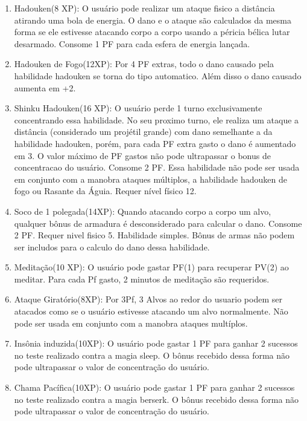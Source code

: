 \begin{enumerate}
  	\item Hadouken(8 XP): O usuário pode realizar um ataque fisico a distância atirando uma bola de energia. O dano e o ataque são calculados da mesma forma se ele estivesse atacando corpo a corpo usando a péricia bélica lutar desarmado. Consome 1 PF para cada esfera de energia lançada. 
  
\item Hadouken de Fogo(12XP): Por 4 PF extras, todo o dano causado pela habilidade hadouken se torna do tipo automatico. Além disso o dano causado aumenta em +2.  

  	\item Shinku Hadouken(16 XP): O usuário perde 1 turno exclusivamente concentrando essa habilidade. No seu proximo turno, ele realiza um ataque a distância (considerado um projétil grande) com dano semelhante a da habilidade hadouken, porém, para cada PF extra gasto o dano é aumentado em 3. O valor máximo de PF gastos não pode ultrapassar o bonus de concentracao do usuário. Consome 2 PF. Essa habilidade não pode ser usada em conjunto com a manobra ataques múltiplos, a habilidade hadouken de fogo ou Rasante da Águia. Requer nível físico 12.

  	\item Soco de 1 polegada(14XP): Quando atacando corpo a corpo um alvo, qualquer bônus de armadura é desconsiderado para calcular o dano. Consome 2 PF. Requer nivel fisico 5. Habilidade simples. Bônus de armas não podem ser includos para o calculo do dano dessa habilidade.
  	
  	\item Meditação(10 XP): O usuário pode gastar PF(1) para recuperar PV(2) ao meditar. Para cada Pf gasto, 2 minutos de meditação são requeridos. 
  
  	\item Ataque Giratório(8XP): Por 3Pf, 3 Alvos ao redor do usuario podem ser atacados como se o usuário estivesse atacando um alvo normalmente. Não pode ser usada em conjunto com a manobra ataques multíplos.

	\item Insônia induzida(10XP): O usuário pode gastar 1 PF para ganhar 2 sucessos no teste realizado contra a magia sleep. O bônus recebido dessa forma não pode ultrapassar o valor de concentração do usuário.

	\item Chama Pacífica(10XP): O usuário pode gastar 1 PF para ganhar 2 sucessos no teste realizado contra a magia berserk. O bônus recebido dessa forma não pode ultrapassar o valor de concentração do usuário.  


\end{enumerate}

